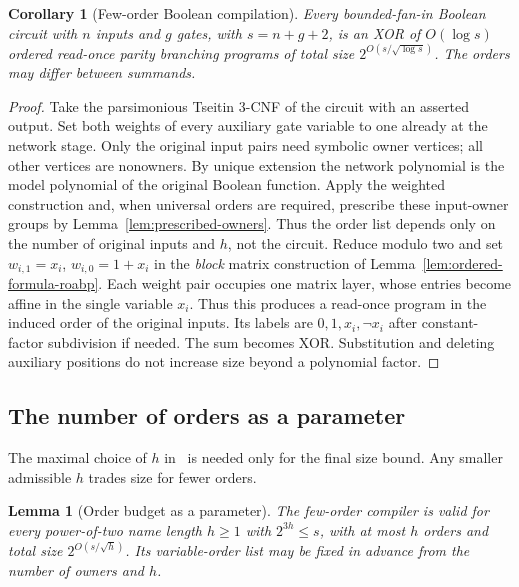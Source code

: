 \documentclass[11pt]{article}
\newtheorem{lemma}[theorem]{Lemma}
\newtheorem{corollary}[theorem]{Corollary}
\theoremstyle{definition}
\theoremstyle{remark}
\begin{document}
\begin{corollary}[Few-order Boolean compilation]
\label{cor:few-order-boolean}
Every bounded-fan-in Boolean circuit with $n$ inputs and $g$ gates,
with $s=n+g+2$, is an XOR of $O(\log s)$ ordered read-once parity
branching programs of total size $2^{O(s/\sqrt{\log s})}$.
The orders may differ between summands.
\end{corollary}

\begin{proof}
Take the parsimonious Tseitin 3-CNF of the circuit with an asserted
output. Set both weights of every auxiliary gate variable to one
already at the network stage. Only the original input pairs need
symbolic owner vertices; all other vertices are nonowners. By unique
extension the network polynomial is the model polynomial of the
original Boolean function. Apply the weighted construction and, when
universal orders are required, prescribe these input-owner groups by
Lemma~\ref{lem:prescribed-owners}. Thus the order list depends only on
the number of original inputs and $h$, not the circuit. Reduce
modulo two and set $w_{i,1}=x_i$, $w_{i,0}=1+x_i$ in the
\emph{block} matrix construction of
Lemma~\ref{lem:ordered-formula-roabp}. Each weight pair occupies one
matrix layer, whose entries become affine in the single variable
$x_i$. Thus this produces a read-once program in the induced order
of the original inputs. Its labels are
$0,1,x_i,\neg x_i$ after constant-factor subdivision if needed. The
sum becomes XOR. Substitution and deleting auxiliary positions do not
increase size beyond a polynomial factor.
\end{proof}

\subsection{The number of orders as a parameter}

The maximal choice of $h$ in~\cite{Cruz26} is needed only for the final
size bound. Any smaller admissible $h$ trades size for fewer orders.

\begin{lemma}[Order budget as a parameter]
\label{lem:variable-order-budget}
The few-order compiler is valid for every power-of-two name length
$h\ge1$ with $2^{3h}\le s$, with at most $h$ orders and total size
$2^{O(s/\sqrt h)}$. Its variable-order list may be fixed in advance
from the number of owners and $h$.
\end{lemma}
\end{document}
